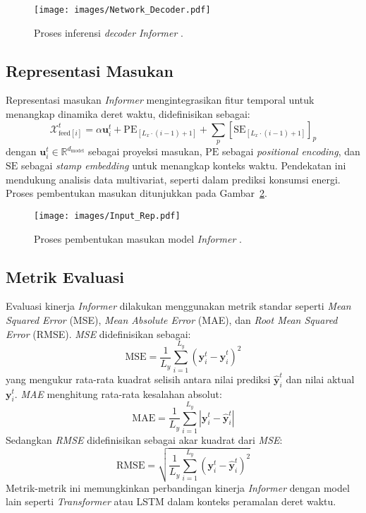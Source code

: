 \begin{figure}[H]
    \centering
    \texttt{[image: images/Network\_Decoder.pdf]}
    \caption{Proses inferensi \textit{decoder} \textit{Informer} \citep{Zhou2021}.}
    \label{fig:network_decoder}
\end{figure}

\subsection{Representasi Masukan}
\label{sec:input_representation}

Representasi masukan \textit{Informer} mengintegrasikan fitur temporal untuk menangkap dinamika deret waktu, didefinisikan sebagai:
\begin{equation}
\mathcal{X}_{\text{feed}[i]}^t = \alpha \mathbf{u}_i^t + \text{PE}_{[L_x \cdot (i-1) + 1]} + \sum_p [\text{SE}_{[L_x \cdot (i-1) + 1]}]_p
\end{equation}
dengan \( \mathbf{u}_i^t \in \mathbb{R}^{d_{\text{model}}} \) sebagai proyeksi masukan, \( \text{PE} \) sebagai \textit{positional encoding}, dan \( \text{SE} \) sebagai \textit{stamp embedding} untuk menangkap konteks waktu. Pendekatan ini mendukung analisis data multivariat, seperti dalam prediksi konsumsi energi. Proses pembentukan masukan ditunjukkan pada Gambar~\ref{fig:input_rep}.

\begin{figure}[H]
    \centering
    \texttt{[image: images/Input\_Rep.pdf]}
    \caption{Proses pembentukan masukan model \textit{Informer} \citep{Zhou2021}.}
    \label{fig:input_rep}
\end{figure}

\subsection{Metrik Evaluasi}
\label{sec:evaluation_metrics}

Evaluasi kinerja \textit{Informer} dilakukan menggunakan metrik standar seperti \textit{Mean Squared Error} (MSE), \textit{Mean Absolute Error} (MAE), dan \textit{Root Mean Squared Error} (RMSE). \textit{MSE} didefinisikan sebagai:
\begin{equation}
\text{MSE} = \frac{1}{L_y} \sum_{i=1}^{L_y} (\mathbf{y}_i^t - \hat{\mathbf{y}}_i^t)^2
\end{equation}
yang mengukur rata-rata kuadrat selisih antara nilai prediksi \( \hat{\mathbf{y}}_i^t \) dan nilai aktual \( \mathbf{y}_i^t \). \textit{MAE} menghitung rata-rata kesalahan absolut:
\begin{equation}
\text{MAE} = \frac{1}{L_y} \sum_{i=1}^{L_y} |\mathbf{y}_i^t - \hat{\mathbf{y}}_i^t|
\end{equation}
Sedangkan \textit{RMSE} didefinisikan sebagai akar kuadrat dari \textit{MSE}:
\begin{equation}
\text{RMSE} = \sqrt{\frac{1}{L_y} \sum_{i=1}^{L_y} (\mathbf{y}_i^t - \hat{\mathbf{y}}_i^t)^2}
\end{equation}
Metrik-metrik ini memungkinkan perbandingan kinerja \textit{Informer} dengan model lain seperti \textit{Transformer} atau LSTM dalam konteks peramalan deret waktu.
